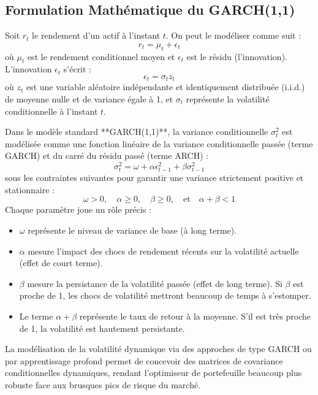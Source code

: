 \subsection{Formulation Mathématique du GARCH(1,1)}
Soit $r_t$ le rendement d'un actif à l'instant $t$. On peut le modéliser comme suit :
\begin{equation}
    r_t = \mu_t + \epsilon_t
\end{equation}
où $\mu_t$ est le rendement conditionnel moyen et $\epsilon_t$ est le résidu (l'innovation). L'innovation $\epsilon_t$ s'écrit :
\begin{equation}
    \epsilon_t = \sigma_t z_t
\end{equation}
où $z_t$ est une variable aléatoire indépendante et identiquement distribuée (i.i.d.) de moyenne nulle et de variance égale à 1, et $\sigma_t$ représente la volatilité conditionnelle à l'instant $t$.

Dans le modèle standard **GARCH(1,1)**, la variance conditionnelle $\sigma_t^2$ est modélisée comme une fonction linéaire de la variance conditionnelle passée (terme GARCH) et du carré du résidu passé (terme ARCH) :
\begin{equation}
    \sigma_t^2 = \omega + \alpha \epsilon_{t-1}^2 + \beta \sigma_{t-1}^2
\end{equation}
sous les contraintes suivantes pour garantir une variance strictement positive et stationnaire :
\begin{equation}
    \omega > 0, \quad \alpha \ge 0, \quad \beta \ge 0, \quad \text{et} \quad \alpha + \beta < 1
\end{equation}
Chaque paramètre joue un rôle précis :
\begin{itemize}
    \item $\omega$ représente le niveau de variance de base (à long terme).
    \item $\alpha$ mesure l'impact des chocs de rendement récents sur la volatilité actuelle (effet de court terme).
    \item $\beta$ mesure la persistance de la volatilité passée (effet de long terme). Si $\beta$ est proche de 1, les chocs de volatilité mettront beaucoup de temps à s'estomper.
    \item Le terme $\alpha + \beta$ représente le taux de retour à la moyenne. S'il est très proche de 1, la volatilité est hautement persistante.
\end{itemize}

La modélisation de la volatilité dynamique via des approches de type GARCH ou par apprentissage profond permet de concevoir des matrices de covariance conditionnelles dynamiques, rendant l'optimiseur de portefeuille beaucoup plus robuste face aux brusques pics de risque du marché.
